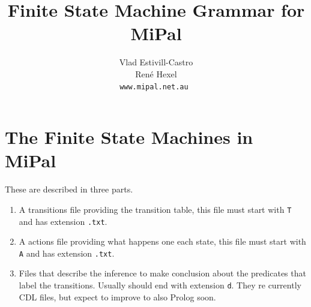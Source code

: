 \documentclass[11pt]{article}
\begin{document}
\title{Finite State Machine Grammar for MiPal}
\author{Vlad Estivill-Castro\\Ren\'{e} Hexel\\
{\tt www.mipal.net.au }
}
\maketitle
\section {The Finite State Machines in MiPal}
These are described in three parts.
\begin{enumerate}
\item A transitions file providing the transition table, this file
must start with {\tt T} and has extension {\tt .txt}.
\item A actions file providing what happens one each state,
this file must start with {\tt A} and has extension {\tt .txt}.
\item Files that describe the inference to make conclusion
about the predicates that label the transitions. Usually
should end with extension {\tt d}. They re currently CDL
files, but expect to improve to also Prolog soon.
\end{enumerate}
\end{document}
